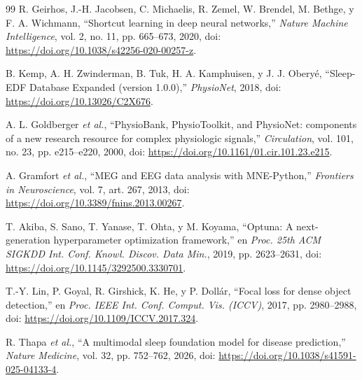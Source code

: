 \documentclass[conference]{IEEEtran}
\begin{document}
\begin{thebibliography}{99}
R. Geirhos, J.-H. Jacobsen, C. Michaelis, R. Zemel, W. Brendel, M. Bethge, y F. A. Wichmann, ``Shortcut learning in deep neural networks,'' \textit{Nature Machine Intelligence}, vol. 2, no. 11, pp. 665--673, 2020, doi: \url{https://doi.org/10.1038/s42256-020-00257-z}.

B. Kemp, A. H. Zwinderman, B. Tuk, H. A. Kamphuisen, y J. J. Oberyé, ``Sleep-EDF Database Expanded (version 1.0.0),'' \textit{PhysioNet}, 2018, doi: \url{https://doi.org/10.13026/C2X676}.

A. L. Goldberger \textit{et al.}, ``PhysioBank, PhysioToolkit, and PhysioNet: components of a new research resource for complex physiologic signals,'' \textit{Circulation}, vol. 101, no. 23, pp. e215--e220, 2000, doi: \url{https://doi.org/10.1161/01.cir.101.23.e215}.

A. Gramfort \textit{et al.}, ``MEG and EEG data analysis with MNE-Python,'' \textit{Frontiers in Neuroscience}, vol. 7, art. 267, 2013, doi: \url{https://doi.org/10.3389/fnins.2013.00267}.

T. Akiba, S. Sano, T. Yanase, T. Ohta, y M. Koyama, ``Optuna: A next-generation hyperparameter optimization framework,'' en \textit{Proc. 25th ACM SIGKDD Int. Conf. Knowl. Discov. Data Min.}, 2019, pp. 2623--2631, doi: \url{https://doi.org/10.1145/3292500.3330701}.

T.-Y. Lin, P. Goyal, R. Girshick, K. He, y P. Dollár, ``Focal loss for dense object detection,'' en \textit{Proc. IEEE Int. Conf. Comput. Vis. (ICCV)}, 2017, pp. 2980--2988, doi: \url{https://doi.org/10.1109/ICCV.2017.324}.

R. Thapa \textit{et al.}, ``A multimodal sleep foundation model for disease prediction,'' \textit{Nature Medicine}, vol. 32, pp. 752--762, 2026, doi: \url{https://doi.org/10.1038/s41591-025-04133-4}.

\end{thebibliography}
\end{document}
